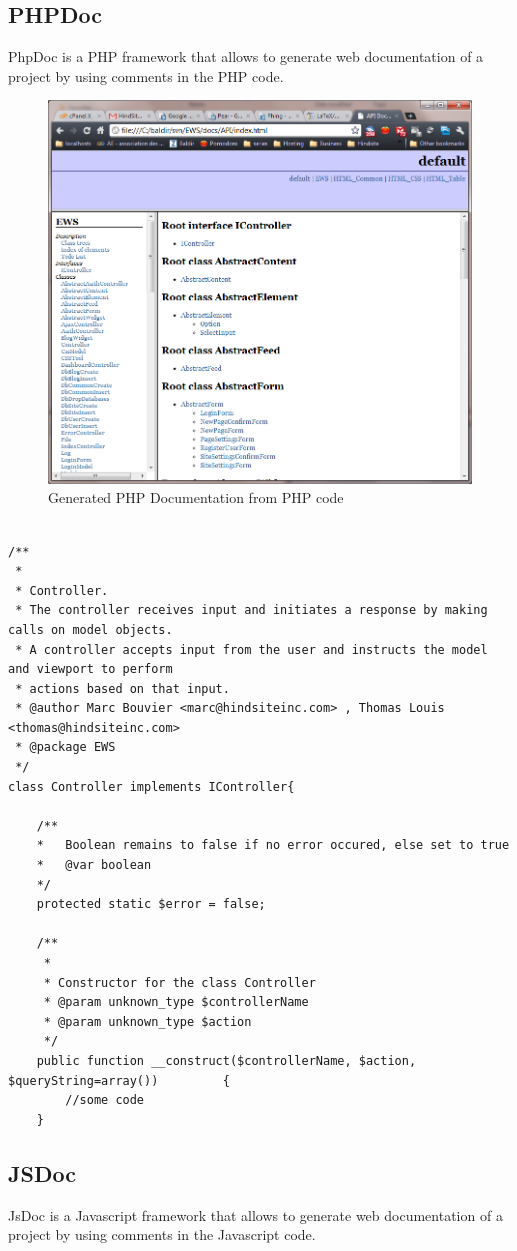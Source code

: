 \subsection{PHPDoc}
PhpDoc is a PHP framework that allows to generate web documentation of a project by using comments in the PHP code.

\begin{figure}[!ht]
\centering
\includegraphics[width=.55\textwidth]{img/phpdoc.png}
\caption{Generated PHP Documentation from PHP code}
\label{figure:phpdoc-web}
\end{figure}

\lstset{language=PHP}
\begin{lstlisting}[label=phpdoc-code,caption=PHP documentation in a PHP class]

/**
 * 
 * Controller. 
 * The controller receives input and initiates a response by making calls on model objects.
 * A controller accepts input from the user and instructs the model and viewport to perform
 * actions based on that input.
 * @author Marc Bouvier <marc@hindsiteinc.com> , Thomas Louis <thomas@hindsiteinc.com>
 * @package	EWS
 */
class Controller implements IController{
	
	/**
	*	Boolean remains to false if no error occured, else set to true
	*	@var boolean
	*/
	protected static $error = false;

	/**
	 * 
	 * Constructor for the class Controller
	 * @param unknown_type $controllerName
	 * @param unknown_type $action
	 */
	public function __construct($controllerName, $action, $queryString=array()) 		{
		//some code
	}
\end{lstlisting}


\subsection{JSDoc}
JsDoc is a Javascript framework that allows to generate web documentation of a project by using comments in the Javascript code.

